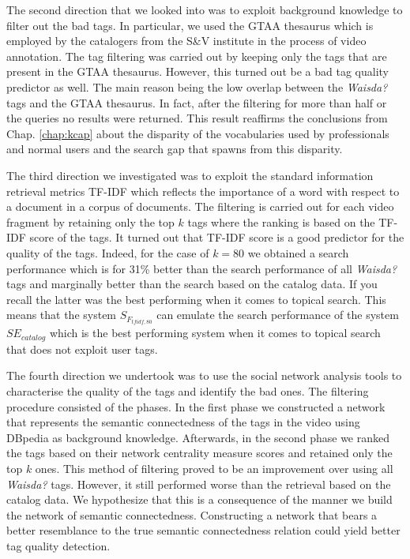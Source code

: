 The second direction that we looked into was to exploit background knowledge to filter out the bad tags. In particular, we used the GTAA thesaurus which is employed by the catalogers from the S\&V institute in the process of video annotation. The tag filtering was carried out by keeping only the tags that are present in the GTAA thesaurus. However, this turned out be a bad tag quality predictor as well. The main reason being the low overlap between the \textit{Waisda?} tags and the GTAA thesaurus. In fact, after the filtering for more than half or the queries no results were returned. This result reaffirms the conclusions from Chap. \ref{chap:kcap} about the disparity of the vocabularies used by professionals and normal users and the search gap that spawns from this disparity.

The third direction we investigated was to exploit the standard information retrieval metrics TF-IDF which reflects the importance of a word with respect to a document in a corpus of documents. The filtering is carried out for each video fragment by retaining only the top $k$ tags where the ranking is based on the TF-IDF score of the tags. It turned out that TF-IDF score is a good predictor for the quality of the tags. Indeed, for the case of $k = 80$ we obtained a search performance which is for 31\% better than the search performance of all \textit{Waisda?} tags and marginally better than the search based on the catalog data. If you recall the latter was the best performing when it comes to topical search. This means that the system $S_{F_{tfidf,80}}$ can emulate the search performance of the system $SE_{catalog}$ which is the best performing system when it comes to topical search that does not exploit user tags. 

The fourth direction we undertook was to use the social network analysis tools to characterise the quality of the tags and identify the bad ones. The filtering procedure consisted of the phases. In the first phase we constructed a network that represents the semantic connectedness of the tags in the video using DBpedia as background knowledge. Afterwards, in the second phase we ranked the tags based on their network centrality measure scores and retained only the top $k$ ones. This method of filtering proved to be an improvement over using all \textit{Waisda?} tags. However, it still performed worse than the retrieval based on the catalog data. We hypothesize that this is a consequence of the manner we build the network of semantic connectedness. Constructing a network that bears a better resemblance to the true semantic connectedness relation could yield better tag quality detection.

